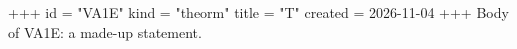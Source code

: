 +++
id = "VA1E"
kind = "theorm"
title = "T"
created = 2026-11-04
+++
Body of VA1E: a made-up statement.
